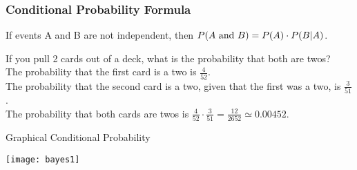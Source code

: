 \begin{frame}
\frametitle{Conditional Probability Formula}
If events A and B are not independent, then $P(A\hbox{ and }B) = P(A) \cdot P(B | A)$.



If you pull 2 cards out of a deck, what is the probability that both are twos?\\ 
\vspace{.1in}
The probability that the first card is a two is  $\frac{4}{52}$.\\ 
\vspace{.1in}
The probability that the second card is a two, given that the first was a two, is  $\frac{3}{51}$.\\ 
\vspace{.1in}
The probability that both cards are twos is  $\frac{4}{52}\cdot \frac{3}{51}=\frac{12}{2652}\simeq 0.00452$.

\end{frame}


%
%
\begin{frame}{ Graphical Conditional Probability}

\begin{center}
\texttt{[image: bayes1]}
\end{center}
\end{frame}




